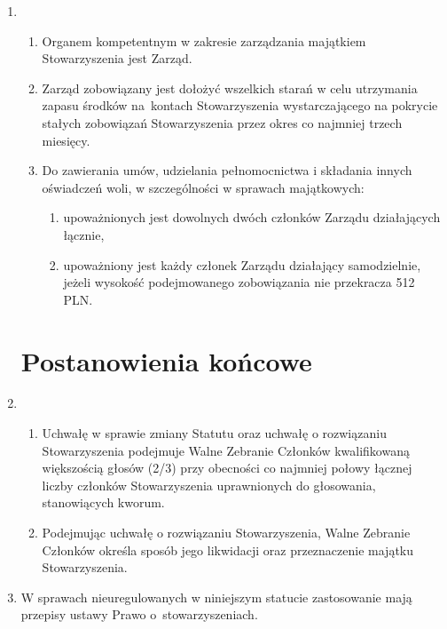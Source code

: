 \documentclass[chapterprefix,notitlepage]{article}
\begin{document}
\begin{enumerate}
	\item \begin{enumerate}
		\item Organem kompetentnym w zakresie zarządzania majątkiem Stowarzyszenia jest Zarząd.
		\item Zarząd zobowiązany jest dołożyć wszelkich starań w celu utrzymania zapasu środków na~kontach Stowarzyszenia wystarczającego na pokrycie stałych zobowiązań Stowarzyszenia przez okres co najmniej trzech miesięcy.
		\item Do zawierania umów, udzielania pełnomocnictwa i składania innych oświadczeń woli, w szczególności w sprawach majątkowych:
		\begin{enumerate}
			\item upoważnionych jest dowolnych dwóch członków Zarządu działających łącznie,
			\item upoważniony jest każdy członek Zarządu działający samodzielnie, jeżeli wysokość podejmowanego zobowiązania nie przekracza 512 PLN.
		\end{enumerate}
	\end{enumerate}
	

\section{Postanowienia końcowe}
	
	\item \begin{enumerate}
		\item Uchwałę w sprawie zmiany Statutu oraz uchwałę o rozwiązaniu Stowarzyszenia podejmuje Walne Zebranie Członków kwalifikowaną większością głosów (2/3) przy obecności co najmniej połowy łącznej liczby członków Stowarzyszenia uprawnionych do głosowania, stanowiących kworum.
		\item Podejmując uchwałę o rozwiązaniu Stowarzyszenia, Walne Zebranie Członków określa sposób jego likwidacji oraz przeznaczenie majątku Stowarzyszenia.
	\end{enumerate}		
	
	\item  W sprawach nieuregulowanych w niniejszym statucie zastosowanie mają przepisy ustawy Prawo o~stowarzyszeniach.
			
\end{enumerate}
\end{document}

